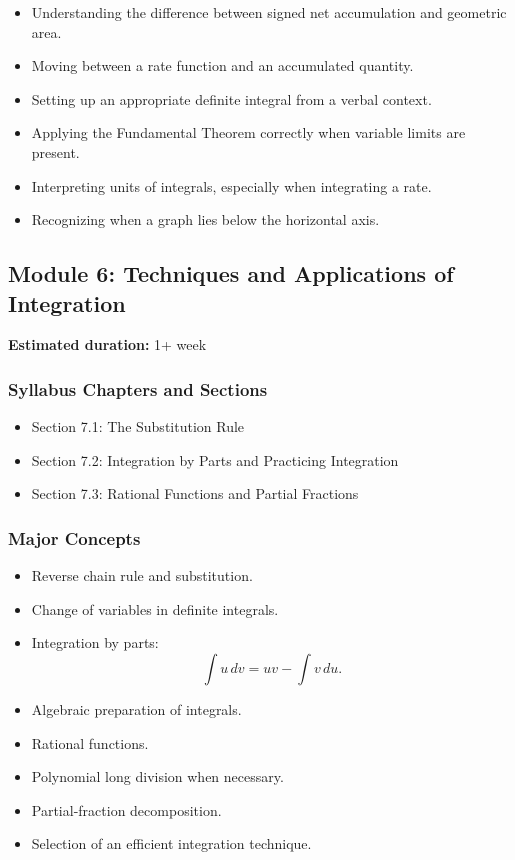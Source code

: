 \documentclass[11pt]{article}
\begin{document}
\begin{itemize}
    \item Understanding the difference between signed net accumulation and geometric area.
    \item Moving between a rate function and an accumulated quantity.
    \item Setting up an appropriate definite integral from a verbal context.
    \item Applying the Fundamental Theorem correctly when variable limits are present.
    \item Interpreting units of integrals, especially when integrating a rate.
    \item Recognizing when a graph lies below the horizontal axis.
\end{itemize}

\subsection{Module 6: Techniques and Applications of Integration}

\textbf{Estimated duration:} 1+ week

\subsubsection{Syllabus Chapters and Sections}

\begin{itemize}
    \item Section 7.1: The Substitution Rule
    \item Section 7.2: Integration by Parts and Practicing Integration
    \item Section 7.3: Rational Functions and Partial Fractions
\end{itemize}

\subsubsection{Major Concepts}

\begin{itemize}
    \item Reverse chain rule and substitution.
    \item Change of variables in definite integrals.
    \item Integration by parts:
    \[
        \int u\,dv = uv-\int v\,du.
    \]
    \item Algebraic preparation of integrals.
    \item Rational functions.
    \item Polynomial long division when necessary.
    \item Partial-fraction decomposition.
    \item Selection of an efficient integration technique.
\end{itemize}
\end{document}
